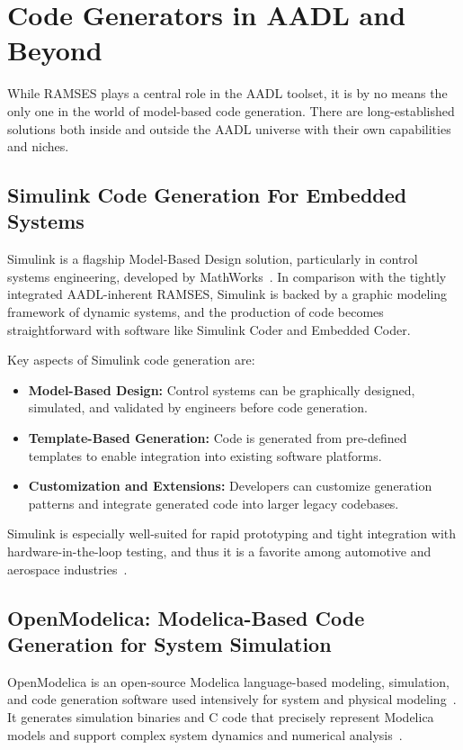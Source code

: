 \section{Code Generators in AADL and Beyond} \label{sub:code_generators}

While RAMSES plays a central role in the AADL toolset, it is by no means the only one in the world of model-based code generation. There are long-established solutions both inside and outside the AADL universe with their own capabilities and niches.


\subsection*{Simulink Code Generation For Embedded Systems}

Simulink is a flagship Model-Based Design solution, particularly in control systems engineering, developed by MathWorks~\cite{simulink_documentation}. In comparison with the tightly integrated AADL-inherent RAMSES, Simulink is backed by a graphic modeling framework of dynamic systems, and the production of code becomes straightforward with software like Simulink Coder and Embedded Coder.

Key aspects of Simulink code generation are:
 \begin{itemize} 
 	\item \textbf{Model-Based Design:} Control systems can be graphically designed, simulated, and validated by engineers before code generation. 
 	\item \textbf{Template-Based Generation:} Code is generated from pre-defined templates to enable integration into existing software platforms. 
 	\item \textbf{Customization and Extensions:} Developers can customize generation patterns and integrate generated code into larger legacy codebases. 
 \end{itemize}

Simulink is especially well-suited for rapid prototyping and tight integration with hardware-in-the-loop testing, and thus it is a favorite among automotive and aerospace industries~\cite{Simulink_automotive_applications}.

\subsection*{OpenModelica: Modelica-Based Code Generation for System Simulation}

OpenModelica is an open-source Modelica language-based modeling, simulation, and code generation software used intensively for system and physical modeling~\cite{openmodelica-home}. It generates simulation binaries and C code that precisely represent Modelica models and support complex system dynamics and numerical analysis~\cite{openmodelica-codegen}.

